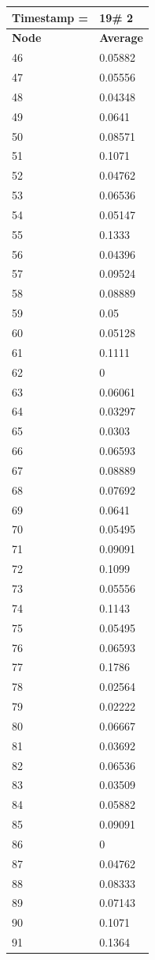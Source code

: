 \begin{tabular}{|l||l|}
\hline
\textbf{Timestamp =} & \textbf{19}\# 2\\\hline
	\textbf{Node} & \textbf{Average} \\ \hline
\hline
	46 & 0.05882 \\ \hline
	47 & 0.05556 \\ \hline
	48 & 0.04348 \\ \hline
	49 & 0.0641 \\ \hline
	50 & 0.08571 \\ \hline
	51 & 0.1071 \\ \hline
	52 & 0.04762 \\ \hline
	53 & 0.06536 \\ \hline
	54 & 0.05147 \\ \hline
	55 & 0.1333 \\ \hline
	56 & 0.04396 \\ \hline
	57 & 0.09524 \\ \hline
	58 & 0.08889 \\ \hline
	59 & 0.05 \\ \hline
	60 & 0.05128 \\ \hline
	61 & 0.1111 \\ \hline
	62 & 0 \\ \hline
	63 & 0.06061 \\ \hline
	64 & 0.03297 \\ \hline
	65 & 0.0303 \\ \hline
	66 & 0.06593 \\ \hline
	67 & 0.08889 \\ \hline
	68 & 0.07692 \\ \hline
	69 & 0.0641 \\ \hline
	70 & 0.05495 \\ \hline
	71 & 0.09091 \\ \hline
	72 & 0.1099 \\ \hline
	73 & 0.05556 \\ \hline
	74 & 0.1143 \\ \hline
	75 & 0.05495 \\ \hline
	76 & 0.06593 \\ \hline
	77 & 0.1786 \\ \hline
	78 & 0.02564 \\ \hline
	79 & 0.02222 \\ \hline
	80 & 0.06667 \\ \hline
	81 & 0.03692 \\ \hline
	82 & 0.06536 \\ \hline
	83 & 0.03509 \\ \hline
	84 & 0.05882 \\ \hline
	85 & 0.09091 \\ \hline
	86 & 0 \\ \hline
	87 & 0.04762 \\ \hline
	88 & 0.08333 \\ \hline
	89 & 0.07143 \\ \hline
	90 & 0.1071 \\ \hline
	91 & 0.1364 \\ \hline
\end{tabular}
